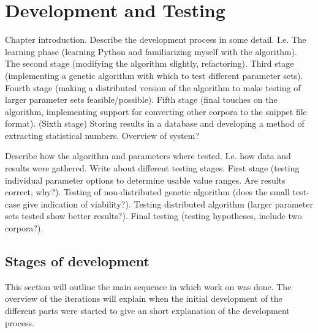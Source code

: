 
\chapter{Development and Testing} %

\label{Development} %



Chapter introduction. Describe the development process in some detail. I.e. The learning phase (learning Python and familiarizing myself with the algorithm). The second stage (modifying the algorithm slightly, refactoring). Third stage (implementing a genetic algorithm with which to test different parameter sets). Fourth stage (making a distributed version of the algorithm to make testing of larger parameter sets feasible/possible). Fifth stage (final touches on the algorithm, implementing support for converting other corpora to the snippet file format). (Sixth stage) Storing results in a database and developing a method of extracting statistical numbers. Overview of system?

Describe how the algorithm and parameters where tested. I.e. how data and results were gathered. Write about different testing stages. First stage (testing individual parameter options to determine usable value ranges. Are results correct, why?). Testing of non-distributed genetic algorithm (does the small test-case give indication of viability?). Testing distributed algorithm (larger parameter sets tested show better results?). Final testing (testing hypotheses, include two corpora?).

\section{Stages of development}
This section will outline the main sequence in which work on was done.
The overview of the iterations will explain when the initial development of
the different parts were started to give an short explanation of the development process.


